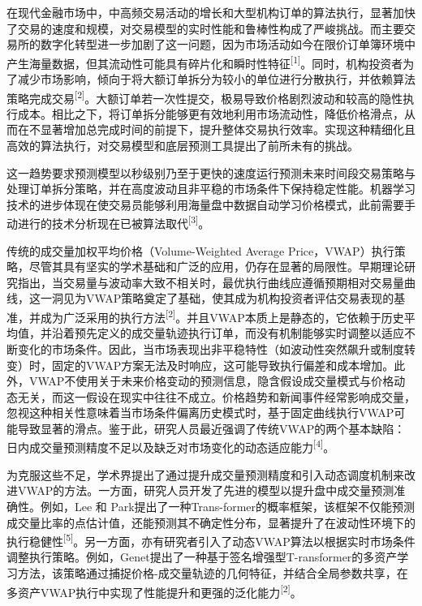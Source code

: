 \documentclass[UTF8]{ctexart}
\begin{document}
在现代金融市场中，中高频交易活动的增长和大型机构订单的算法执行，显著加快了交易的速度和规模，对交易模型的实时性能和鲁棒性构成了严峻挑战。而主要交易所的数字化转型进一步加剧了这一问题，因为市场活动如今在限价订单簿环境中产生海量数据，但其流动性可能具有碎片化和瞬时性特征\textsuperscript{{[}1{]}}。同时，机构投资者为了减少市场影响，倾向于将大额订单拆分为较小的单位进行分散执行，并依赖算法策略完成交易\textsuperscript{{[}2{]}}。大额订单若一次性提交，极易导致价格剧烈波动和较高的隐性执行成本。相比之下，将订单拆分能够更有效地利用市场流动性，降低价格滑点，从而在不显著增加总完成时间的前提下，提升整体交易执行效率。实现这种精细化且高效的算法执行，对交易模型和底层预测工具提出了前所未有的挑战。

这一趋势要求预测模型以秒级别乃至于更快的速度运行预测未来时间段交易策略与处理订单拆分策略，并在高度波动且非平稳的市场条件下保持稳定性能。机器学习技术的进步体现在使交易员能够利用海量盘中数据自动学习价格模式，此前需要手动进行的技术分析现在已被算法取代\textsuperscript{{[}3{]}}。

传统的成交量加权平均价格（Volume-Weighted Average
Price，VWAP）执行策略，尽管其具有坚实的学术基础和广泛的应用，仍存在显著的局限性。早期理论研究指出，当交易量与波动率大致不相关时，最优执行曲线应遵循预期相对交易量曲线，这一洞见为VWAP策略奠定了基础，使其成为机构投资者评估交易表现的基准，并成为广泛采用的执行方法\textsuperscript{{[}2{]}}。并且VWAP本质上是静态的，它依赖于历史平均值，并沿着预先定义的成交量轨迹执行订单，而没有机制能够实时调整以适应不断变化的市场条件。因此，当市场表现出非平稳特性（如波动性突然飙升或制度转变）时，固定的VWAP方案无法及时响应，这可能导致执行偏差和成本增加。此外，VWAP不使用关于未来价格变动的预测信息，隐含假设成交量模式与价格动态无关，而这一假设在现实中往往不成立。价格趋势和新闻事件经常影响成交量，忽视这种相关性意味着当市场条件偏离历史模式时，基于固定曲线执行VWAP可能导致显著的滑点。鉴于此，研究人员最近强调了传统VWAP的两个基本缺陷：日内成交量预测精度不足以及缺乏对市场变化的动态适应能力\textsuperscript{{[}4{]}}。

为克服这些不足，学术界提出了通过提升成交量预测精度和引入动态调度机制来改进VWAP的方法。一方面，研究人员开发了先进的模型以提升盘中成交量预测准确性。例如，Lee
和
Park提出了一种Trans-former的概率框架，该框架不仅能预测成交量比率的点估计值，还能预测其不确定性分布，显著提升了在波动性环境下的执行稳健性\textsuperscript{{[}5{]}}。另一方面，亦有研究者引入了动态VWAP算法以根据实时市场条件调整执行策略。例如，Genet提出了一种基于签名增强型T-ransformer的多资产学习方法，该策略通过捕捉价格-成交量轨迹的几何特征，并结合全局参数共享，在多资产VWAP执行中实现了性能提升和更强的泛化能力\textsuperscript{{[}2{]}}。
\end{document}
